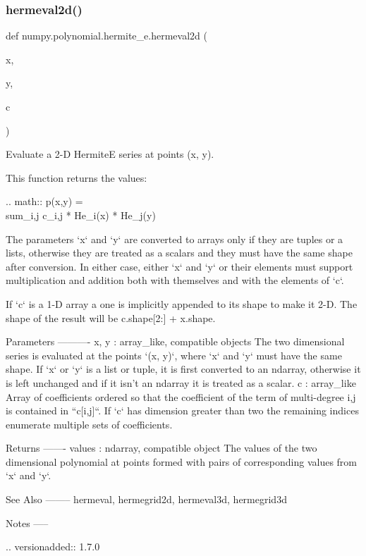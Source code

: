 \subsubsection{\texorpdfstring{hermeval2d()}{hermeval2d()}}
{\footnotesize\ttfamily def numpy.\+polynomial.\+hermite\+\_\+e.\+hermeval2d (\begin{DoxyParamCaption}\item[{}]{x,  }\item[{}]{y,  }\item[{}]{c }\end{DoxyParamCaption})}

\begin{DoxyVerb}Evaluate a 2-D HermiteE series at points (x, y).

This function returns the values:

.. math:: p(x,y) = \\sum_{i,j} c_{i,j} * He_i(x) * He_j(y)

The parameters `x` and `y` are converted to arrays only if they are
tuples or a lists, otherwise they are treated as a scalars and they
must have the same shape after conversion. In either case, either `x`
and `y` or their elements must support multiplication and addition both
with themselves and with the elements of `c`.

If `c` is a 1-D array a one is implicitly appended to its shape to make
it 2-D. The shape of the result will be c.shape[2:] + x.shape.

Parameters
----------
x, y : array_like, compatible objects
    The two dimensional series is evaluated at the points `(x, y)`,
    where `x` and `y` must have the same shape. If `x` or `y` is a list
    or tuple, it is first converted to an ndarray, otherwise it is left
    unchanged and if it isn't an ndarray it is treated as a scalar.
c : array_like
    Array of coefficients ordered so that the coefficient of the term
    of multi-degree i,j is contained in ``c[i,j]``. If `c` has
    dimension greater than two the remaining indices enumerate multiple
    sets of coefficients.

Returns
-------
values : ndarray, compatible object
    The values of the two dimensional polynomial at points formed with
    pairs of corresponding values from `x` and `y`.

See Also
--------
hermeval, hermegrid2d, hermeval3d, hermegrid3d

Notes
-----

.. versionadded:: 1.7.0\end{DoxyVerb}
 \mbox{\label{namespacenumpy_1_1polynomial_1_1hermite__e_a363bddfd2b0cbd6b2006a54827bcfc20}} 
